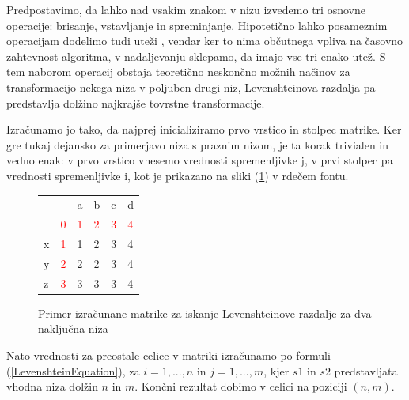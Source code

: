 \documentclass[a4paper,12pt,openright]{book}
\begin{document}
Predpostavimo, da lahko nad vsakim znakom v nizu izvedemo tri osnovne operacije: brisanje, vstavljanje in spreminjanje. Hipotetično lahko posameznim operacijam dodelimo tudi uteži \cite{weightedLevenshtein}, vendar ker to nima občutnega vpliva na časovno zahtevnost algoritma, v nadaljevanju sklepamo, da imajo vse tri enako utež. S tem naborom operacij obstaja teoretično neskončno možnih načinov za transformacijo nekega niza v poljuben drugi niz, Levenshteinova razdalja pa predstavlja dolžino najkrajše tovrstne transformacije. 

Izračunamo jo tako, da najprej inicializiramo prvo vrstico in stolpec matrike. Ker gre tukaj dejansko za primerjavo niza s praznim nizom, je ta korak trivialen in vedno enak: v prvo vrstico vnesemo vrednosti spremenljivke j, v prvi stolpec pa vrednosti spremenljivke i, kot je prikazano na sliki (\ref{levenshteinExample}) v rdečem fontu.



\begin{figure}[htb]
\begin{center}
\begin{tabular}{|l|l|l|l|l|l|}
\cline{3-6}
  \multicolumn{2}{c|}{}  & a & b & c & d\\ \cline{2-6}
 \multicolumn{1}{c|}{} & \textcolor{red}{0} & \textcolor{red}{1} & \textcolor{red}{2} & \textcolor{red}{3} & \textcolor{red}{4}\\ \hline
x  & \textcolor{red}{1}  & \cellcolor{blue!15}1 &  2 & 3 & 4\\ \hline
y  & \textcolor{red}{2} & 2 & \cellcolor{blue!15}2 & 3 & 4\\ \hline
z  & \textcolor{red}{3} & 3 & 3 & \cellcolor{blue!15}3 & \cellcolor{blue!25}4 \\ \hline
\end{tabular}

\end{center}
\caption{Primer izračunane matrike za iskanje Levenshteinove razdalje za dva naključna niza}
\label{levenshteinExample}
\end{figure}


Nato vrednosti za preostale celice v matriki izračunamo po formuli (\ref{LevenshteinEquation}), za \begin{math}i=1,...,n\end{math} in \begin{math}j=1,...,m\end{math}, kjer \begin{math}s1\end{math} in \begin{math}s2\end{math} predstavljata vhodna niza dolžin \begin{math}n\end{math} in \begin{math}m\end{math}. Končni rezultat dobimo v celici na poziciji \begin{math}(n, m)\end{math}. 
\end{document}
